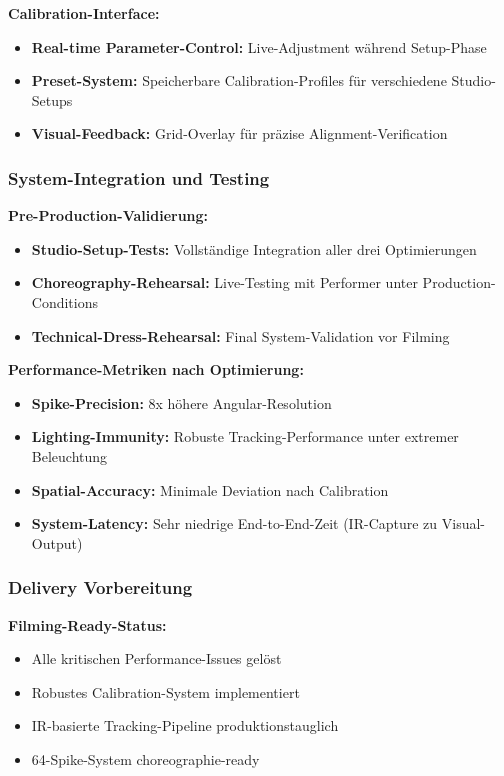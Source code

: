 \textbf{Calibration-Interface:}
\begin{itemize}
    \item \textbf{Real-time Parameter-Control:} Live-Adjustment während Setup-Phase
    \item \textbf{Preset-System:} Speicherbare Calibration-Profiles für verschiedene Studio-Setups
    \item \textbf{Visual-Feedback:} Grid-Overlay für präzise Alignment-Verification
\end{itemize}

\subsubsection{System-Integration und Testing}

\textbf{Pre-Production-Validierung:}
\begin{itemize}
    \item \textbf{Studio-Setup-Tests:} Vollständige Integration aller drei Optimierungen
    \item \textbf{Choreography-Rehearsal:} Live-Testing mit Performer unter Production-Conditions
    \item \textbf{Technical-Dress-Rehearsal:} Final System-Validation vor Filming
\end{itemize}

\textbf{Performance-Metriken nach Optimierung:}
\begin{itemize}
    \item \textbf{Spike-Precision:} 8x höhere Angular-Resolution
    \item \textbf{Lighting-Immunity:} Robuste Tracking-Performance unter extremer Beleuchtung
    \item \textbf{Spatial-Accuracy:} Minimale Deviation nach Calibration
    \item \textbf{System-Latency:} Sehr niedrige End-to-End-Zeit (IR-Capture zu Visual-Output)
\end{itemize}

\subsubsection{Delivery Vorbereitung}

\textbf{Filming-Ready-Status:}
\begin{itemize}
    \item Alle kritischen Performance-Issues gelöst
    \item Robustes Calibration-System implementiert
    \item IR-basierte Tracking-Pipeline produktionstauglich
    \item 64-Spike-System choreographie-ready
\end{itemize}

